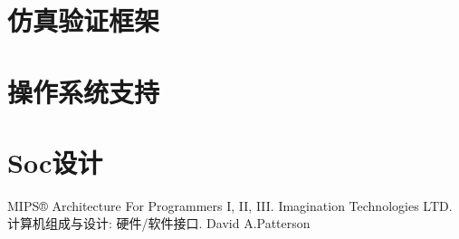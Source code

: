 \documentclass[black,normal,cn,hide]{elegantbook}
\begin{document}
\chapter{仿真验证框架}
\chapter{操作系统支持}
\chapter{Soc设计}



\newpage
\renewcommand{\bibname}{参考资料}
\begin{thebibliography}{99}
	 MIPS® Architecture For Programmers I, II, III. Imagination Technologies LTD.  
   计算机组成与设计: 硬件/软件接口. David A.Patterson
\end{thebibliography}
\end{document}
